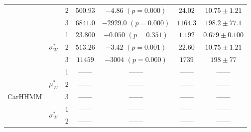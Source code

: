\documentclass{article}
\begin{document}
\begin{center}
{\begin{tabular}{ccccccc}
                            &                               & 2                                & $500.93$                         & $-4.86$ $(p=0.000)$          & $24.02$                             & $10.75 \pm 1.21$                             \\
                            &                               & 3                                & $6841.0$                         & $-2929.0$ $(p=0.000)$        & $1164.3$                             & $198.2 \pm 77.1$                             \\
                            & \multirow{3}{*}{$\sigma_W^*$} & 1                                & $23.800$                         & $-0.050$ $(p=0.351)$         & $1.192$                             & $0.679 \pm 0.100$                             \\
                            &                               & 2                                & $513.26$                         & $-3.42$ $(p=0.001)$          & $22.60$                             & $10.75 \pm 1.21$                             \\
                            &                               & 3                                & $11459$                          & $-3004$ $(p=0.000)$          & $1739$                              & $198 \pm 77$                             \\ \hline
\multirow{6}{*}{CarHHMM}    & \multirow{3}{*}{$\mu_W^*$}    & 1                                & ------                         & ------                     & ------                             & ------                                      \\
                            &                               & 2                                & ------                         & ------                     & ------                             & ------                                      \\
                            &                               & 3                                & ------                         & ------                     & ------                             & ------                                      \\
                            & \multirow{3}{*}{$\sigma_W^*$} & 1                                & ------                         & ------                     & ------                             & ------                                      \\
                            &                               & 2                                & ------                         & ------                     & ------                             & ------                                      \\

\end{tabular}}
\end{center}
\end{document}
